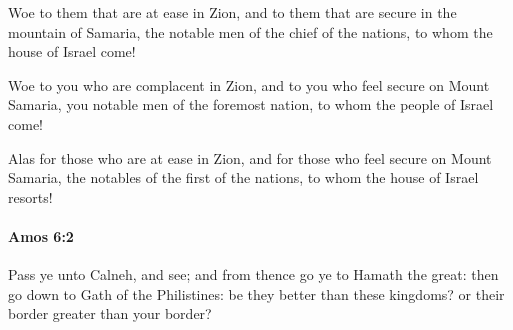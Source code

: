 			\begin{versebox}
					\item[BHS] 
					\item[LXX] 
					\item[ASV] Woe to them that are at ease in Zion, and to them that are secure in the mountain of Samaria, the notable men of the chief of the nations, to whom the house of Israel come!
					\item[NIV] Woe to you who are complacent in Zion, and to you who feel secure on Mount Samaria, you notable men of the foremost nation, to whom the people of Israel come!
					\item[NRSV] Alas for those who are at ease in Zion, and for those who feel secure on Mount Samaria, the notables of the first of the nations, to whom the house of Israel resorts!
			\end{versebox}

		\paragraph{Amos 6:2} %
			\label{AMOS-6-2}

			Pass ye unto Calneh, and see; and from thence go ye to Hamath the great: then go down to Gath of the Philistines: be they better than these kingdoms? or their border greater than your border?

